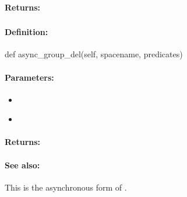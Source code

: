 \paragraph{Returns:}


\pagebreak
\subsubsection{}
\label{api:python:async_group_del}


\paragraph{Definition:}
\begin{pythoncode}
def async_group_del(self, spacename, predicates)
\end{pythoncode}

\paragraph{Parameters:}
\begin{itemize}[noitemsep]
\item {}\\

\item {}\\

\end{itemize}

\paragraph{Returns:}


\paragraph{See also:}  This is the asynchronous form of .

\pagebreak
\subsubsection{}
\label{api:python:atomic_add}


